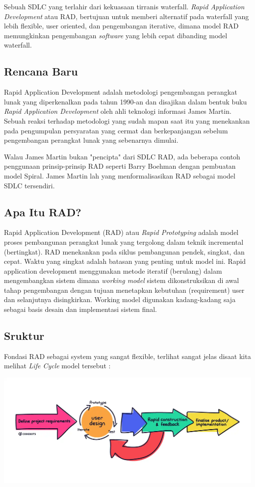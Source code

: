 Sebuah SDLC yang terlahir dari kekuasaan tirranis waterfall. \emph{Rapid Application Development} atau RAD,
bertujuan untuk memberi alternatif pada waterfall yang lebih flexible, user oriented, dan pengembangan iterative,
dimana model RAD memungkinkan pengembangan \emph{software} yang lebih cepat dibanding model waterfall.

\subsection{Rencana Baru}
Rapid Application Development adalah metodologi pengembangan perangkat lunak 
yang diperkenalkan pada tahun 1990-an dan disajikan dalam bentuk buku \emph{Rapid Application Development}
oleh ahli teknologi informasi James Martin. Sebuah reaksi terhadap metodologi yang sudah 
mapan saat itu yang menekankan pada pengumpulan persyaratan yang cermat dan 
berkepanjangan sebelum pengembangan perangkat lunak yang sebenarnya dimulai.\cite{bestpricecomputer}

Walau James Martin bukan "pencipta" dari SDLC RAD, ada beberapa contoh penggunaan prinsip-prinsip
RAD seperti Barry Boehman dengan pembuatan model Spiral. James Martin lah yang menformalisasikan
RAD sebagai model SDLC tersendiri.

\subsection{Apa Itu RAD?}
Rapid Application Development (RAD) atau \emph{Rapid Prototyping} adalah model 
proses pembangunan perangkat lunak yang tergolong dalam teknik incremental (bertingkat). 
RAD menekankan pada siklus pembangunan pendek, singkat, dan cepat. Waktu yang singkat 
adalah batasan yang penting untuk model ini. Rapid application development menggunakan 
metode iteratif (berulang) dalam mengembangkan sistem dimana \emph{working model} 
sistem dikonstruksikan di awal tahap pengembangan dengan tujuan menetapkan kebutuhan (requirement) 
user dan selanjutnya disingkirkan. Working model digunakan kadang-kadang saja sebagai basis desain dan implementasi sistem final.\cite{anakkos}

\subsection{Sruktur}
Fondasi RAD sebagai system yang sangat flexible, terlihat sangat jelas disaat kita melihat
\emph{Life Cycle} model tersebut\cite{codebots} :

\includegraphics[width=1.05\textwidth, angle=-90]{images/rad-cycle.png}\newline

